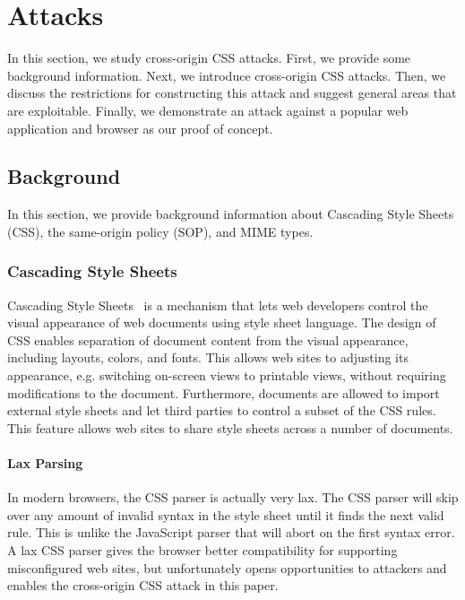 \documentclass{acm_proc_article-sp}
\begin{document}
\section{Attacks}
In this section, we study cross-origin CSS attacks. First, we provide some background information. Next, we introduce cross-origin CSS attacks. Then, we discuss the restrictions for constructing this attack and suggest general areas that are exploitable. Finally, we demonstrate an attack against a popular web application and browser as our proof of concept.

\subsection{Background}
In this section, we provide background information about Cascading Style Sheets (CSS), the same-origin policy (SOP), and MIME types.

\subsubsection{Cascading Style Sheets}
Cascading Style Sheets~\cite{css} is a mechanism that lets web developers control the visual appearance of web documents using style sheet language. The design of CSS enables separation of document content from the visual appearance, including layouts, colors, and fonts. This allows web sites to adjusting its appearance, e.g. switching on-screen views to printable views, without requiring modifications to the document. Furthermore, documents are allowed to import external style sheets and let third parties to control a subset of the CSS rules. This feature allows web sites to share style sheets across a number of documents.

\paragraph{Lax Parsing}
In modern browsers, the CSS parser is actually very lax. The CSS parser will skip over any amount of invalid syntax in the style sheet until it finds the next valid rule. This is unlike the JavaScript parser that will abort on the first syntax error. A lax CSS parser gives the browser better compatibility for supporting misconfigured web sites, but unfortunately opens opportunities to attackers and enables the cross-origin CSS attack in this paper.

\end{document}
